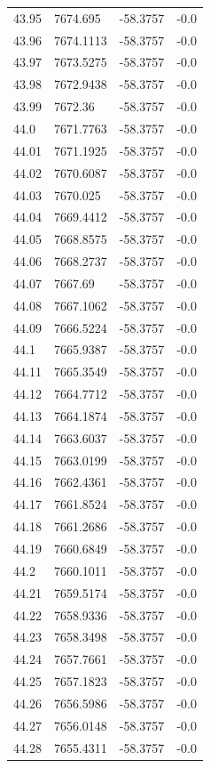 \begin{table}[H]
\begin{tabular}{llll}
43.95 & 7674.695 & -58.3757 & -0.0 \\
43.96 & 7674.1113 & -58.3757 & -0.0 \\
43.97 & 7673.5275 & -58.3757 & -0.0 \\
43.98 & 7672.9438 & -58.3757 & -0.0 \\
43.99 & 7672.36 & -58.3757 & -0.0 \\
44.0 & 7671.7763 & -58.3757 & -0.0 \\
44.01 & 7671.1925 & -58.3757 & -0.0 \\
44.02 & 7670.6087 & -58.3757 & -0.0 \\
44.03 & 7670.025 & -58.3757 & -0.0 \\
44.04 & 7669.4412 & -58.3757 & -0.0 \\
44.05 & 7668.8575 & -58.3757 & -0.0 \\
44.06 & 7668.2737 & -58.3757 & -0.0 \\
44.07 & 7667.69 & -58.3757 & -0.0 \\
44.08 & 7667.1062 & -58.3757 & -0.0 \\
44.09 & 7666.5224 & -58.3757 & -0.0 \\
44.1 & 7665.9387 & -58.3757 & -0.0 \\
44.11 & 7665.3549 & -58.3757 & -0.0 \\
44.12 & 7664.7712 & -58.3757 & -0.0 \\
44.13 & 7664.1874 & -58.3757 & -0.0 \\
44.14 & 7663.6037 & -58.3757 & -0.0 \\
44.15 & 7663.0199 & -58.3757 & -0.0 \\
44.16 & 7662.4361 & -58.3757 & -0.0 \\
44.17 & 7661.8524 & -58.3757 & -0.0 \\
44.18 & 7661.2686 & -58.3757 & -0.0 \\
44.19 & 7660.6849 & -58.3757 & -0.0 \\
44.2 & 7660.1011 & -58.3757 & -0.0 \\
44.21 & 7659.5174 & -58.3757 & -0.0 \\
44.22 & 7658.9336 & -58.3757 & -0.0 \\
44.23 & 7658.3498 & -58.3757 & -0.0 \\
44.24 & 7657.7661 & -58.3757 & -0.0 \\
44.25 & 7657.1823 & -58.3757 & -0.0 \\
44.26 & 7656.5986 & -58.3757 & -0.0 \\
44.27 & 7656.0148 & -58.3757 & -0.0 \\
44.28 & 7655.4311 & -58.3757 & -0.0 \\

\end{tabular}
\end{table}
